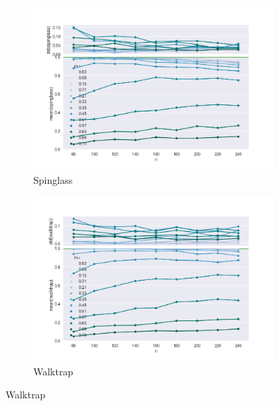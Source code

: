\begin{figure}
    \begin{subfigure}[b]{0.32\textwidth}
        \includegraphics[width=\textwidth]{fig/ami_vs_n_spinglass}
        \caption{Spinglass}
        \label{fig:gull}
    \end{subfigure}
    \qquad
    \begin{subfigure}[b]{0.32\textwidth}
        \includegraphics[width=\textwidth]{fig/ami_vs_n_walktrap}
        \caption{Walktrap}
        \label{fig:tiger}
    \end{subfigure}
    

\end{figure}
